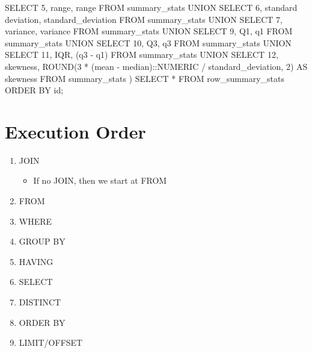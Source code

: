 \documentclass[
  letterpaper,
  DIV=11,
  numbers=noendperiod]{scrreprt}
\newenvironment{Shaded}{\begin{snugshade}}{\end{snugshade}}
\newcommand{\CharTok}[1]{\textcolor[rgb]{0.13,0.47,0.30}{#1}}
\newcommand{\DecValTok}[1]{\textcolor[rgb]{0.68,0.00,0.00}{#1}}
\newcommand{\FunctionTok}[1]{\textcolor[rgb]{0.28,0.35,0.67}{#1}}
\newcommand{\KeywordTok}[1]{\textcolor[rgb]{0.00,0.23,0.31}{#1}}
\newcommand{\NormalTok}[1]{\textcolor[rgb]{0.00,0.23,0.31}{#1}}
\newcommand{\OperatorTok}[1]{\textcolor[rgb]{0.37,0.37,0.37}{#1}}
\newcommand{\StringTok}[1]{\textcolor[rgb]{0.13,0.47,0.30}{#1}}
\providecommand{\tightlist}{%
  \setlength{\itemsep}{0pt}\setlength{\parskip}{0pt}}\usepackage{longtable,booktabs,array}
\begin{document}
\begin{Shaded}
\begin{Highlighting}[]
\KeywordTok{SELECT} 
 \DecValTok{5}\NormalTok{, }
 \StringTok{\textquotesingle{}range\textquotesingle{}}\NormalTok{, }
 \KeywordTok{range} 
  \KeywordTok{FROM}\NormalTok{ summary\_stats}
\KeywordTok{UNION}
\KeywordTok{SELECT} 
 \DecValTok{6}\NormalTok{, }
 \StringTok{\textquotesingle{}standard deviation\textquotesingle{}}\NormalTok{, }
\NormalTok{ standard\_deviation }
  \KeywordTok{FROM}\NormalTok{ summary\_stats}
\KeywordTok{UNION}
\KeywordTok{SELECT} 
 \DecValTok{7}\NormalTok{, }
 \StringTok{\textquotesingle{}variance\textquotesingle{}}\NormalTok{, }
 \FunctionTok{variance} 
  \KeywordTok{FROM}\NormalTok{ summary\_stats}
\KeywordTok{UNION}
\KeywordTok{SELECT} 
 \DecValTok{9}\NormalTok{, }
 \StringTok{\textquotesingle{}Q1\textquotesingle{}}\NormalTok{, }
\NormalTok{ q1 }
  \KeywordTok{FROM}\NormalTok{ summary\_stats}
\KeywordTok{UNION}
\KeywordTok{SELECT} 
 \DecValTok{10}\NormalTok{, }
 \StringTok{\textquotesingle{}Q3\textquotesingle{}}\NormalTok{, }
\NormalTok{ q3 }
  \KeywordTok{FROM}\NormalTok{ summary\_stats}
\KeywordTok{UNION}
\KeywordTok{SELECT} 
 \DecValTok{11}\NormalTok{, }
 \StringTok{\textquotesingle{}IQR\textquotesingle{}}\NormalTok{, }
\NormalTok{ (q3 }\OperatorTok{{-}}\NormalTok{ q1) }
  \KeywordTok{FROM}\NormalTok{ summary\_stats}
\KeywordTok{UNION}
\KeywordTok{SELECT} 
 \DecValTok{12}\NormalTok{, }
 \StringTok{\textquotesingle{}skewness\textquotesingle{}}\NormalTok{, }
 \FunctionTok{ROUND}\NormalTok{(}\DecValTok{3} \OperatorTok{*}\NormalTok{ (mean }\OperatorTok{{-}} \FunctionTok{median}\NormalTok{):}\CharTok{:NUMERIC} \OperatorTok{/}\NormalTok{ standard\_deviation, }\DecValTok{2}\NormalTok{) }\KeywordTok{AS}\NormalTok{ skewness }
  \KeywordTok{FROM}\NormalTok{ summary\_stats}
\NormalTok{)}
\KeywordTok{SELECT} \OperatorTok{*} 
 \KeywordTok{FROM}\NormalTok{ row\_summary\_stats}
  \KeywordTok{ORDER} \KeywordTok{BY} \KeywordTok{id}\NormalTok{;}
\end{Highlighting}
\end{Shaded}

\hypertarget{execution-order}{%
\section{Execution Order}\label{execution-order}}

\begin{enumerate}
\def\labelenumi{\arabic{enumi}.}
\tightlist
\item
  JOIN

  \begin{itemize}
  \tightlist
  \item
    If no JOIN, then we start at FROM
  \end{itemize}
\item
  FROM
\item
  WHERE
\item
  GROUP BY
\item
  HAVING
\item
  SELECT
\item
  DISTINCT
\item
  ORDER BY
\item
  LIMIT/OFFSET
\end{enumerate}
\end{document}
